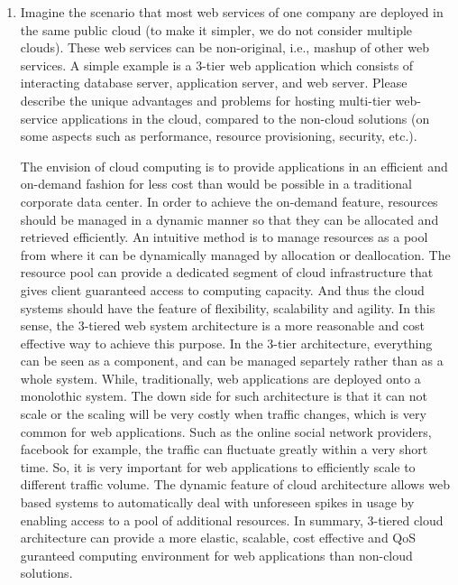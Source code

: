 \documentclass{article}
\begin{document}
\begin{enumerate}
\newpage
\item Imagine the scenario that most web services of one company are
deployed in the same public cloud (to make it simpler, we do not
consider multiple clouds). These web services can be non-original,
i.e., mashup of other web services. A simple example is a 3-tier web
application which consists of interacting database server, application
server, and web server. Please describe the unique advantages and
problems for hosting multi-tier web-service applications in the cloud,
compared to the non-cloud solutions (on some aspects such as
performance, resource provisioning, security, etc.).  

The envision of cloud computing is to provide applications in an
efficient and on-demand fashion for less cost than would be possible
in a traditional corporate data center. In order to achieve the
on-demand feature, resources should be managed in a dynamic manner so
that they can be allocated and retrieved efficiently. An intuitive
method is to manage resources as a pool from where it can be
dynamically managed by allocation or deallocation. The resource pool
can provide a dedicated segment of cloud infrastructure that gives
client guaranteed access to computing capacity. And thus the cloud
systems should have the feature of flexibility, scalability and
agility. In this sense, the 3-tiered web system architecture is a more
reasonable and cost effective way to achieve this purpose. In the
3-tier architecture, everything can be seen as a component, and can be
managed separtely rather than as a whole system.  While,
traditionally, web applications are deployed onto a monolothic
system. The down side for such architecture is that it can not scale
or the scaling will be very costly when traffic changes, which is very
common for web applications. Such as the online social network
providers, facebook for example, the traffic can fluctuate greatly
within a very short time. So, it is very important for web
applications to efficiently scale to different traffic volume. The
dynamic feature of cloud architecture allows web based systems to
automatically deal with unforeseen spikes in usage by enabling access
to a pool of additional resources. In summary, 3-tiered cloud
architecture can provide a more elastic, scalable, cost effective and
QoS guranteed computing environment for web applications than
non-cloud solutions. 


\end{enumerate}
\end{document}
